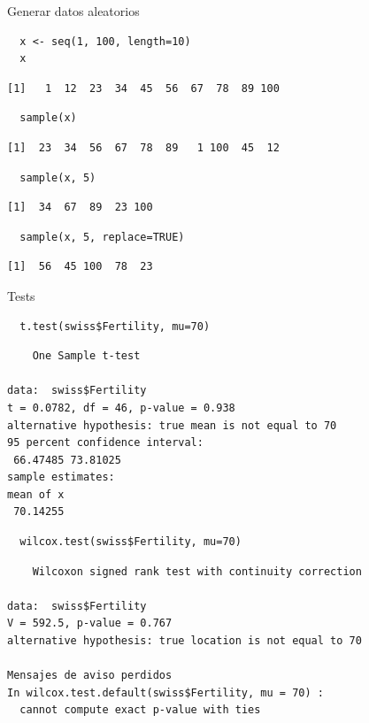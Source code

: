 \documentclass[xcolor={usenames,svgnames,dvipsnames}]{beamer}
\begin{document}
\begin{frame}[fragile,label=sec-2-4]{Generar datos aleatorios}
 \lstset{language=R,label= ,caption= ,numbers=none}
\begin{lstlisting}
  x <- seq(1, 100, length=10)
  x
\end{lstlisting}

\begin{verbatim}
[1]   1  12  23  34  45  56  67  78  89 100
\end{verbatim}

\lstset{language=R,label= ,caption= ,numbers=none}
\begin{lstlisting}
  sample(x)
\end{lstlisting}

\begin{verbatim}
[1]  23  34  56  67  78  89   1 100  45  12
\end{verbatim}

\lstset{language=R,label= ,caption= ,numbers=none}
\begin{lstlisting}
  sample(x, 5)
\end{lstlisting}

\begin{verbatim}
[1]  34  67  89  23 100
\end{verbatim}

\lstset{language=R,label= ,caption= ,numbers=none}
\begin{lstlisting}
  sample(x, 5, replace=TRUE)
\end{lstlisting}

\begin{verbatim}
[1]  56  45 100  78  23
\end{verbatim}
\end{frame}

\begin{frame}[fragile,label=sec-2-5]{Tests}
 \lstset{language=R,label= ,caption= ,numbers=none}
\begin{lstlisting}
  t.test(swiss$Fertility, mu=70)
\end{lstlisting}

\begin{verbatim}
	One Sample t-test

data:  swiss$Fertility
t = 0.0782, df = 46, p-value = 0.938
alternative hypothesis: true mean is not equal to 70
95 percent confidence interval:
 66.47485 73.81025
sample estimates:
mean of x 
 70.14255
\end{verbatim}

\lstset{language=R,label= ,caption= ,numbers=none}
\begin{lstlisting}
  wilcox.test(swiss$Fertility, mu=70)
\end{lstlisting}

\begin{verbatim}
	Wilcoxon signed rank test with continuity correction

data:  swiss$Fertility
V = 592.5, p-value = 0.767
alternative hypothesis: true location is not equal to 70

Mensajes de aviso perdidos
In wilcox.test.default(swiss$Fertility, mu = 70) :
  cannot compute exact p-value with ties
\end{verbatim}
\end{frame}
\end{document}
